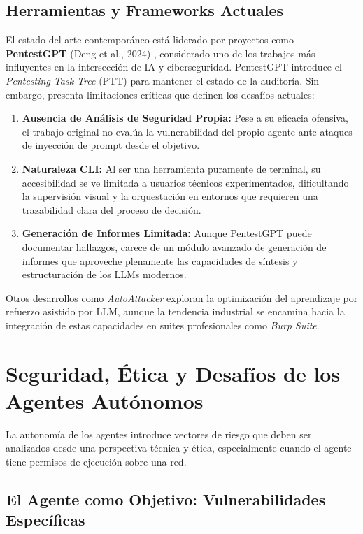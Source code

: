 \subsection{Herramientas y Frameworks Actuales}

El estado del arte contemporáneo está liderado por proyectos como \textbf{PentestGPT} (Deng et al., 2024) \cite{deng2023pentestgpt}, considerado uno de los trabajos más influyentes en la intersección de IA y ciberseguridad. PentestGPT introduce el \textit{Pentesting Task Tree} (PTT) para mantener el estado de la auditoría. Sin embargo, presenta limitaciones críticas que definen los desafíos actuales:
\begin{enumerate}
    \item \textbf{Ausencia de Análisis de Seguridad Propia:} Pese a su eficacia ofensiva, el trabajo original no evalúa la vulnerabilidad del propio agente ante ataques de inyección de prompt desde el objetivo.
    \item \textbf{Naturaleza CLI:} Al ser una herramienta puramente de terminal, su accesibilidad se ve limitada a usuarios técnicos experimentados, dificultando la supervisión visual y la orquestación en entornos que requieren una trazabilidad clara del proceso de decisión.
    \item \textbf{Generación de Informes Limitada:} Aunque PentestGPT puede documentar hallazgos, carece de un módulo avanzado de generación de informes que aproveche plenamente las capacidades de síntesis y estructuración de los LLMs modernos.
\end{enumerate}
Otros desarrollos como \textit{AutoAttacker} exploran la optimización del aprendizaje por refuerzo asistido por LLM, aunque la tendencia industrial se encamina hacia la integración de estas capacidades en suites profesionales como \textit{Burp Suite}. \cite{song2024autoattacker}


\section{Seguridad, Ética y Desafíos de los Agentes Autónomos}

La autonomía de los agentes introduce vectores de riesgo que deben ser analizados desde una perspectiva técnica y ética, especialmente cuando el agente tiene permisos de ejecución sobre una red.

\subsection{El Agente como Objetivo: Vulnerabilidades Específicas}


